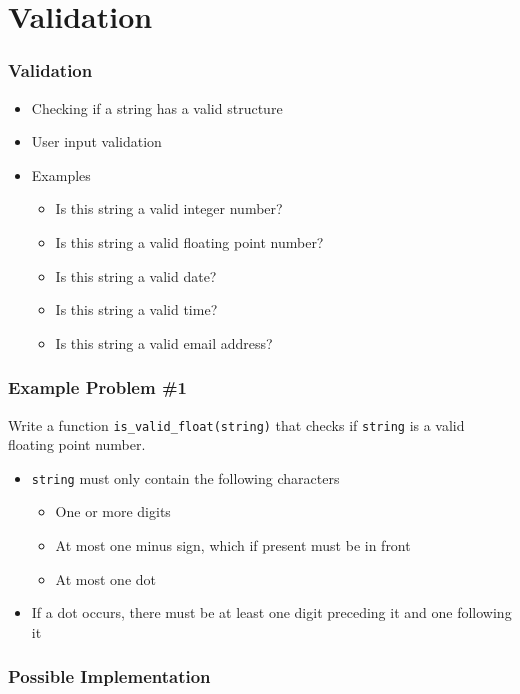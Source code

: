 \section{Validation}

\frame{\tableofcontents[currentsection]}

\begin{frame}
  \frametitle{Validation}
  \begin{itemize}
    \item Checking if a string has a valid structure
    \item User input validation
    \item Examples
      \begin{itemize}
        \item Is this string a valid integer number?
        \item Is this string a valid floating point number?
        \item Is this string a valid date?
        \item Is this string a valid time?
        \item Is this string a valid email address?
      \end{itemize}
  \end{itemize}
\end{frame}

\begin{frame}
  \frametitle{Example Problem \#1}
  \begin{center}
    Write a function \texttt{is\_valid\_float(string)} that checks if \texttt{string} is a valid floating point number.
  \end{center}
  \vskip5mm
  \begin{itemize}
    \item \texttt{string} must only contain the following characters
      \begin{itemize}
        \item One or more digits
        \item At most one minus sign, which if present must be in front
        \item At most one dot
      \end{itemize}
    \item If a dot occurs, there must be at least one digit preceding it and one following it
  \end{itemize}
\end{frame}

\begin{frame}
  \frametitle{Possible Implementation}
\end{frame}

